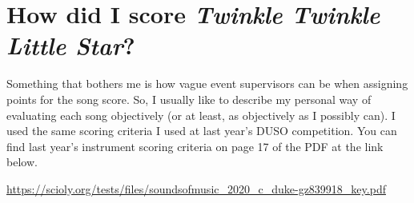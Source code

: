 \documentclass[12pt,letterpaper]{article}
\begin{document}
\section{How did I score \emph{Twinkle Twinkle Little Star}?}

Something that bothers me is how vague event supervisors can be when assigning points for the song score. So, I usually like to describe my personal way of evaluating each song objectively (or at least, as objectively as I possibly can). I used the same scoring criteria I used at last year's DUSO competition. You can find last year's instrument scoring criteria on page 17 of the PDF at the link below. 

\url{https://scioly.org/tests/files/soundsofmusic_2020_c_duke-gz839918_key.pdf}

\vfill
\hfill{}
\end{document}
